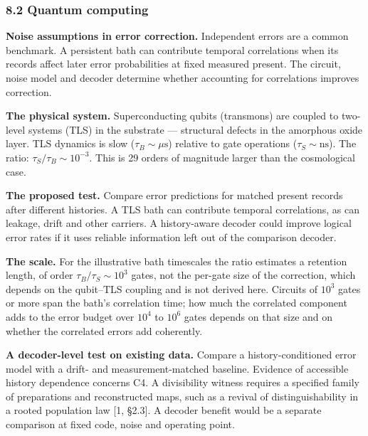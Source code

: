 \documentclass[
]{article}
\begin{document}
\hypertarget{quantum-computing}{%
\subsubsection{8.2 Quantum computing}\label{quantum-computing}}

\textbf{Noise assumptions in error correction.} Independent errors are a
common benchmark. A persistent bath can contribute temporal correlations
when its records affect later error probabilities at fixed measured
present. The circuit, noise model and decoder determine whether
accounting for correlations improves correction.

\textbf{The physical system.} Superconducting qubits (transmons) are
coupled to two-level systems (TLS) in the substrate --- structural
defects in the amorphous oxide layer. TLS dynamics is slow
(\(\tau_B \sim \mu\text{s}\)) relative to gate operations
(\(\tau_S \sim \text{ns}\)). The ratio:
\(\tau_S / \tau_B \sim 10^{-3}\). This is 29 orders of magnitude larger
than the cosmological case.

\textbf{The proposed test.} Compare error predictions for matched
present records after different histories. A TLS bath can contribute
temporal correlations, as can leakage, drift and other carriers. A
history-aware decoder could improve logical error rates if it uses
reliable information left out of the comparison decoder.

\textbf{The scale.} For the illustrative bath timescales the ratio
estimates a retention length, of order \(\tau_B / \tau_S \sim 10^3\)
gates, not the per-gate size of the correction, which depends on the
qubit--TLS coupling and is not derived here. Circuits of \(10^3\) gates
or more span the bath's correlation time; how much the correlated
component adds to the error budget over \(10^4\) to \(10^6\) gates
depends on that size and on whether the correlated errors add
coherently.

\textbf{A decoder-level test on existing data.} Compare a
history-conditioned error model with a drift- and measurement-matched
baseline. Evidence of accessible history dependence concerns C4. A
divisibility witness requires a specified family of preparations and
reconstructed maps, such as a revival of distinguishability in a rooted
population law {[}1, §2.3{]}. A decoder benefit would be a separate
comparison at fixed code, noise and operating point.
\end{document}
